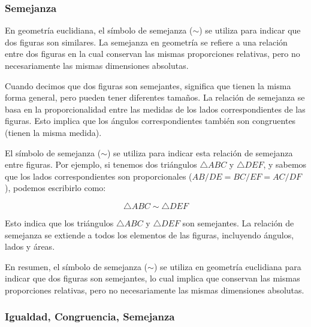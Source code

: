\subsubsection{Semejanza}

En geometría euclidiana, el símbolo de semejanza ($\sim$) se utiliza para indicar que dos figuras son similares. La semejanza en geometría se refiere a una relación entre dos figuras en la cual conservan las mismas proporciones relativas, pero no necesariamente las mismas dimensiones absolutas.

Cuando decimos que dos figuras son semejantes, significa que tienen la misma forma general, pero pueden tener diferentes tamaños. La relación de semejanza se basa en la proporcionalidad entre las medidas de los lados correspondientes de las figuras. Esto implica que los ángulos correspondientes también son congruentes (tienen la misma medida).

El símbolo de semejanza ($\sim$) se utiliza para indicar esta relación de semejanza entre figuras. Por ejemplo, si tenemos dos triángulos $\triangle{ABC}$ y $\triangle{DEF}$, y sabemos que los lados correspondientes son proporcionales ($AB/DE = BC/EF = AC/DF$), podemos escribirlo como:

$$\triangle{ABC} \sim \triangle{DEF}$$

Esto indica que los triángulos $\triangle{ABC}$ y $\triangle{DEF}$ son semejantes. La relación de semejanza se extiende a todos los elementos de las figuras, incluyendo ángulos, lados y áreas.

En resumen, el símbolo de semejanza ($\sim$) se utiliza en geometría euclidiana para indicar que dos figuras son semejantes, lo cual implica que conservan las mismas proporciones relativas, pero no necesariamente las mismas dimensiones absolutas.

\subsubsection{Igualdad, Congruencia, Semejanza}

